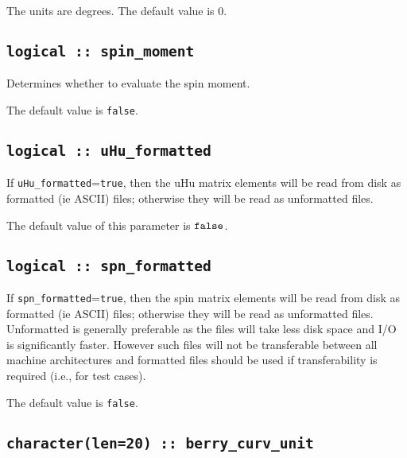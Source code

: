 The units are degrees. The default value is 0.

\subsection[spin\_moment]{\tt logical :: spin\_moment}
Determines whether to evaluate the spin moment.

The default value is \verb#false#.

\subsection[uHu\_formatted]{\tt logical :: uHu\_formatted}

If \verb#uHu_formatted#=\verb#true#, then the uHu matrix elements will be
read from disk as formatted (ie ASCII) files; otherwise they will be
read as unformatted files.

The default value of this parameter is $\verb#false#$.




\subsection[spn\_formatted]{\tt logical :: spn\_formatted}

If \verb#spn_formatted#=\verb#true#, then the spin matrix elements
will be read from disk as formatted (ie ASCII) files; otherwise they
will be read as unformatted files. Unformatted is generally preferable
as the files will take less disk space and I/O is significantly
faster. However such files will not be transferable between all
machine architectures and formatted files should be used if
transferability is required (i.e., for test cases).

The default value is \verb#false#.


\subsection[spn\_formatted]{\tt character(len=20) :: berry\_curv\_unit}

